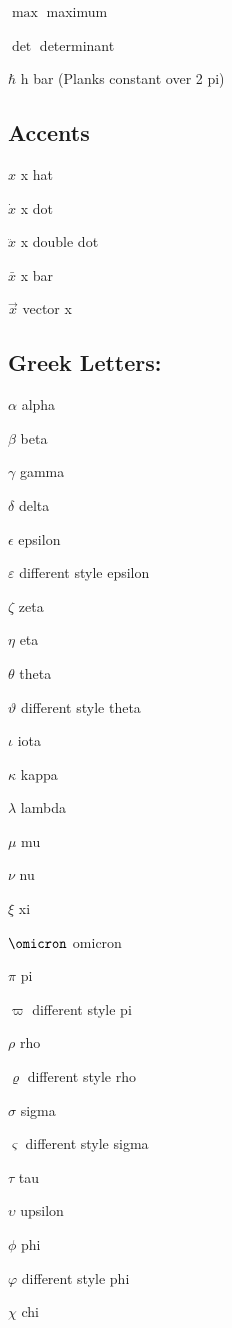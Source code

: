 \documentclass[a4paper]{article}
\begin{document}
$\max$ maximum 

$\det$ determinant 

$\hbar$ h bar (Planks constant over 2 pi) 


\subsection{Accents} 

$\hat{x}$ x hat 

$\dot{x}$ x dot 

$\ddot{x}$ x double dot 

$\bar{x} $ x bar 

$\vec{x}$ vector x 


\subsection{ Greek Letters:} 

$\alpha$ alpha 

$\beta$ beta 

$\gamma$ gamma 

$\delta$ delta 

$\epsilon$ epsilon 

$\varepsilon$ different style epsilon 

$\zeta$ zeta 

$\eta$ eta 

$\theta$ theta 

$\vartheta$ different style theta 

$\iota$ iota 

$\kappa$ kappa 

$\lambda$ lambda 

$\mu$ mu 

$\nu$ nu 

$\xi$ xi 

$\omicron$ omicron 

$\pi$ pi 

$\varpi$ different style pi 

$\rho$ rho 

$\varrho$ different style rho 

$\sigma$ sigma 

$\varsigma$ different style sigma 

$\tau$ tau 

$\upsilon$ upsilon 

$\phi$ phi 

$\varphi$ different style phi 

$\chi$ chi 
\end{document}
